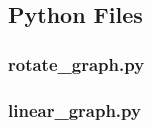 \documentclass[a4paper, 12pt]{article}
\begin{document}
    \pagebreak
    \subsection{Python Files}
    \subsubsection{rotate\_graph.py}
    
    \pagebreak
    \subsubsection{linear\_graph.py}
    
\end{document}
